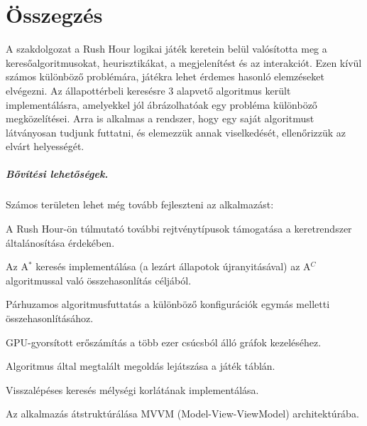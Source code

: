 \chapter{Összegzés}
\label{ch:sum}

A szakdolgozat a Rush Hour logikai játék keretein belül valósította meg a keresőalgoritmusokat, heurisztikákat, a megjelenítést és az interakciót. Ezen kívül számos különböző problémára, játékra lehet érdemes hasonló elemzéseket elvégezni.
Az állapottérbeli keresésre 3 alapvető algoritmus került implementálásra, amelyekkel jól ábrázolhatóak egy probléma különböző megközelítései. Arra is alkalmas a rendszer, hogy egy saját algoritmust látványosan tudjunk futtatni, és elemezzük annak viselkedését, ellenőrizzük az elvárt helyességét. 

\paragraph{Bővítési lehetőségek.} Számos területen lehet még tovább fejleszteni az alkalmazást:
\begin{compactitem}
\item A Rush Hour-ön túlmutató további rejtvénytípusok támogatása a keretrendszer általánosítása érdekében.
\item Az A$^*$ keresés implementálása (a lezárt állapotok újranyitásával) az A$^C$ algoritmussal való összehasonlítás céljából.
\item Párhuzamos algoritmusfuttatás a különböző konfigurációk egymás melletti összehasonlításához.
\item GPU-gyorsított erőszámítás a több ezer csúcsból álló gráfok kezeléséhez.
\item Algoritmus által megtalált megoldás lejátszása a játék táblán.
\item Visszalépéses keresés mélységi korlátának implementálása.
\item Az alkalmazás átstruktúrálása MVVM (Model-View-ViewModel) architektúrába.
\end{compactitem}
